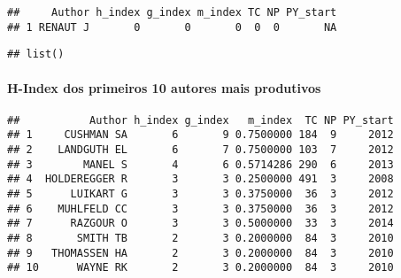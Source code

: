 \documentclass[]{article}
\newenvironment{Shaded}{\begin{snugshade}}{\end{snugshade}}
\newcommand{\KeywordTok}[1]{\textcolor[rgb]{0.13,0.29,0.53}{\textbf{#1}}}
\newcommand{\DataTypeTok}[1]{\textcolor[rgb]{0.13,0.29,0.53}{#1}}
\newcommand{\DecValTok}[1]{\textcolor[rgb]{0.00,0.00,0.81}{#1}}
\newcommand{\StringTok}[1]{\textcolor[rgb]{0.31,0.60,0.02}{#1}}
\newcommand{\OperatorTok}[1]{\textcolor[rgb]{0.81,0.36,0.00}{\textbf{#1}}}
\newcommand{\NormalTok}[1]{#1}
\let\oldparagraph\paragraph
\renewcommand{\paragraph}[1]{\oldparagraph{#1}\mbox{}}
\begin{document}
\begin{verbatim}
##     Author h_index g_index m_index TC NP PY_start
## 1 RENAUT J       0       0       0  0  0       NA
\end{verbatim}

\begin{Shaded}
\end{Shaded}

\begin{verbatim}
## list()
\end{verbatim}

\paragraph{H-Index dos primeiros 10 autores mais
produtivos}\label{h-index-dos-primeiros-10-autores-mais-produtivos}

\begin{Shaded}
\end{Shaded}

\begin{verbatim}
##           Author h_index g_index   m_index  TC NP PY_start
## 1     CUSHMAN SA       6       9 0.7500000 184  9     2012
## 2    LANDGUTH EL       6       7 0.7500000 103  7     2012
## 3        MANEL S       4       6 0.5714286 290  6     2013
## 4  HOLDEREGGER R       3       3 0.2500000 491  3     2008
## 5      LUIKART G       3       3 0.3750000  36  3     2012
## 6    MUHLFELD CC       3       3 0.3750000  36  3     2012
## 7      RAZGOUR O       3       3 0.5000000  33  3     2014
## 8       SMITH TB       2       3 0.2000000  84  3     2010
## 9   THOMASSEN HA       2       3 0.2000000  84  3     2010
## 10      WAYNE RK       2       3 0.2000000  84  3     2010
\end{verbatim}
\end{document}
